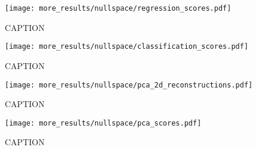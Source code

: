 \documentclass[../main.tex]{subfiles}
\begin{document}
\begin{figure}[H]%
  \centering
    \texttt{[image: more\_results/nullspace/regression\_scores.pdf]}
    \caption[regression scores]{CAPTION}\label{fig:regression_scores}
\end{figure}

\begin{figure}[H]%
  \centering
    \texttt{[image: more\_results/nullspace/classification\_scores.pdf]}
    \caption[classification scores]{CAPTION}\label{fig:classification_scores}
\end{figure}

\begin{figure}[H]%
  \centering
    \texttt{[image: more\_results/nullspace/pca\_2d\_reconstructions.pdf]}
    \caption[PCA projections of null space into two dimensions]{CAPTION}\label{fig:pca_null}
\end{figure}

\begin{figure}[H]%
  \centering
    \texttt{[image: more\_results/nullspace/pca\_scores.pdf]}
    \caption[Classification scores of PCA reconstructions]{CAPTION}\label{fig:pca_scores}
\end{figure}



\end{document}
